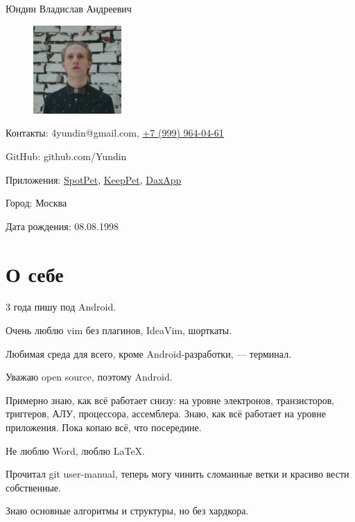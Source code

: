 \documentclass[a4paper,12pt]{article}
\begin{document}
    {\huge Юндин Владислав Андреевич}

    \setlength\intextsep{0pt}
    \begin{figure}
        \includegraphics[width=0.3\textwidth]{avatar_square}
    \end{figure}

    \bigskip
    Контакты: 4yundin@gmail.com, \href{tel:+79999640461}{\color{black}+7 (999) 964-04-61}\par
    GitHub: github.com/Yundin
    
    Приложения: \href{https://play.google.com/store/apps/details?id=com.juntoteam.spotpet}{SpotPet}, \href{https://play.google.com/store/apps/details?id=com.juntoteam.keeppet}{KeepPet}, \href{https://play.google.com/store/apps/details?id=com.app.qavala1}{DaxApp}
    
    Город: Москва\par
    Дата рождения: 08.08.1998\par

    \vspace{7ex}
    \section*{О себе}

    3 года пишу под Android.

    Очень люблю vim без плагинов, IdeaVim, шорткаты. 

    Любимая среда для всего, кроме Android-разработки, --- терминал.

    Уважаю open source, поэтому Android.

    Примерно знаю, как всё работает снизу: на уровне электронов, транзисторов, триггеров, АЛУ, процессора, ассемблера. Знаю, как всё работает на уровне приложения. Пока копаю всё, что посередине.

    Не люблю Word, люблю \LaTeX.

    Прочитал git user-manual, теперь могу чинить сломанные ветки и красиво вести собственные.

    Знаю основные алгоритмы и структуры, но без хардкора.
\end{document}

